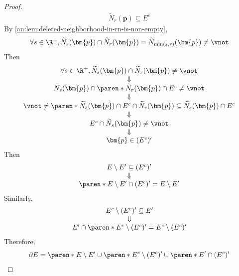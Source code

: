 \begin{proof}
\[\begin{array}{c}
      \widetilde{N}_{r}(\bm{p}) \subseteq E^{c}
    \end{array}
  \]
  By \cref{an:lem:deleted-neighborhood-in-rn-is-non-empty},
  \[
    \forall s \in \R^{+}, \widetilde{N}_{s}(\bm{p}) \cap \widetilde{N}_{r}(\bm{p}) =
    \widetilde{N}_{\min(s,r)}(\bm{p}) \neq \vnot
  \]
  Then
  \[
    \begin{array}{c}
      \forall s \in \R^{+}, \widetilde{N}_{s}(\bm{p}) \cap \widetilde{N}_{r}(\bm{p}) \neq \vnot \\
      \Downarrow                                                                                \\
      \widetilde{N}_{s}(\bm{p}) \cap \paren*{\widetilde{N}_{r}(\bm{p}) \cap E^{c}} \neq \vnot   \\
      \Downarrow                                                                                \\
      \vnot \neq \paren*{\widetilde{N}_{s}(\bm{p}) \cap E^{c}} \cap \widetilde{N}_{r}(\bm{p})
      \subseteq \widetilde{N}_{s}(\bm{p}) \cap E^{c}                                            \\
      \Downarrow                                                                                \\
      E^{c} \cap \widetilde{N}_{s}(\bm{p}) \neq \vnot                                           \\
      \Downarrow                                                                                \\
      \bm{p} \in (E^{c})'
    \end{array}
  \]
  Then
  \[
    \begin{array}{c}
      E \setminus E' \subseteq (E^{c})' \\
      \Downarrow                        \\
      \paren*{E \setminus E'} \cap (E^{c})' = E \setminus E'
    \end{array}
  \]
  Similarly,
  \[
    \begin{array}{c}
      E^{c} \setminus (E^{c})' \subseteq E' \\
      \Downarrow                            \\
      E' \cap \paren*{E^{c} \setminus (E^{c})'} = E^{c} \setminus (E^{c})'
    \end{array}
  \]
  Therefore,
  \[
    \partial E = \paren*{E \setminus E'} \cup \paren*{E^{c} \setminus (E^{c})'} \cup \paren*{E' \cap (E^{c})'}
  \]
\end{proof}
